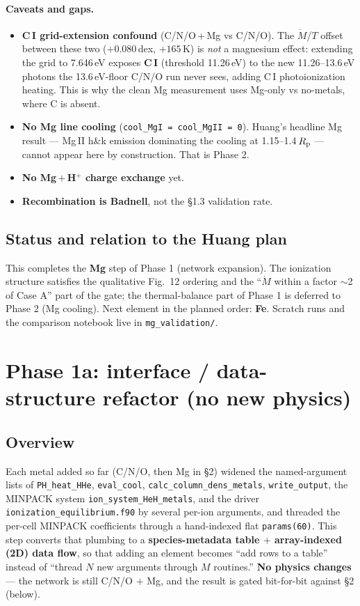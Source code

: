 \documentclass[english,a4paper]{kiseon_memo}
\begin{document}
\paragraph{Caveats and gaps.}
\begin{itemize}
\item \textbf{C\,I grid-extension confound} (C/N/O\,+\,Mg vs C/N/O). The
  $\dot M$/$T$ offset between these two ($+0.080$\,dex, $+165$\,K) is \emph{not} a
  magnesium effect: extending the grid to 7.646\,eV exposes \textbf{C\,I}
  (threshold 11.26\,eV) to the new 11.26--13.6\,eV photons the 13.6\,eV-floor
  C/N/O run never sees, adding C\,I photoionization heating. This is why the
  clean Mg measurement uses Mg-only vs no-metals, where C is absent.
\item \textbf{No Mg line cooling} (\verb|cool_MgI = cool_MgII = 0|). Huang's
  headline Mg result --- Mg\,II h\&k emission dominating the cooling at
  1.15--1.4\,$R_{\rm p}$ --- cannot appear here by construction. That is Phase 2.
\item \textbf{No Mg\,$+$\,H$^+$ charge exchange} yet.
\item \textbf{Recombination is Badnell}, not the \S1.3 validation rate.
\end{itemize}

\subsection{Status and relation to the Huang plan}

This completes the \textbf{Mg} step of Phase 1 (network expansion). The
ionization structure satisfies the qualitative Fig.\ 12 ordering and the
``$\dot M$ within a factor $\sim$2 of Case A'' part of the gate; the
thermal-balance part of Phase 1 is deferred to Phase 2 (Mg cooling). Next element
in the planned order: \textbf{Fe}. Scratch runs and the comparison notebook live
in \texttt{mg\_validation/}.

\section{Phase 1a: interface / data-structure refactor (no new physics)}

\subsection{Overview}

Each metal added so far (C/N/O, then Mg in \S2) widened the named-argument lists
of \verb|PH_heat_HHe|, \verb|eval_cool|, \verb|calc_column_dens_metals|,
\verb|write_output|, the MINPACK system \verb|ion_system_HeH_metals|, and the driver
\verb|ionization_equilibrium.f90| by several per-ion arguments, and threaded the
per-cell MINPACK coefficients through a hand-indexed flat \verb|params(60)|. This
step converts that plumbing to a \textbf{species-metadata table $+$
array-indexed (2D) data flow}, so that adding an element becomes ``add rows to a
table'' instead of ``thread $N$ new arguments through $M$ routines.'' \textbf{No
physics changes} --- the network is still C/N/O $+$ Mg, and the result is gated
bit-for-bit against \S2 (below).
\end{document}
